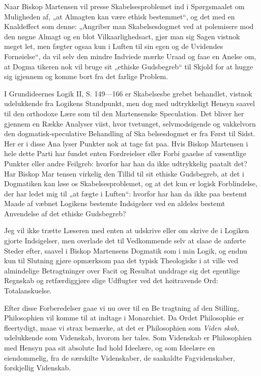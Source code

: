 \documentclass[12pt]{book}
\newcommand{\opage}[1]{\marginnote{\footnotesize\textit{[#1]}}}
\begin{document}
Naar Biskop Martensen vil presse Skabelsesproblemet
ind i Spørgsmaalet om Muligheden af, „at Almagten kan
være ethisk bestemmet“, og det med en Knaldeffect som denne:
„Angriber man Skabelsesdogmet ved at polemisere mod den
nøgne Almagt og en blot Vilkaarlighedsact, gjør man sig
Sagen vistnok meget let, men fægter ogsaa kun i Luften til
sin egen og de Uvidendes Fornøielse“, da vil selv den mindre
Indviede mærke Uraad og faae en Anelse om, at Dogma\-%
tikeren nok vil bruge sit „ethiske Gudsbegreb“ til Skjold for at
hugge sig igjennem og komme bort fra det farlige Problem.

I Grundideernes Logik II, S. 149---166 er Skabelsesbe\-%
grebet behandlet, vistnok udelukkende fra Logikens Standpunkt, men
dog med udtrykkeligt Hensyn saavel til den orthodoxe Lære som
til den Martensenske Speculation. Det bliver her gjennem
en Række Analyser viist, hvor tvetunget, selvmodsigende og
vakkelvorn den dogmatisk-speculative Behandling af Ska\-%
belsesdogmet er fra Først til Sidst. Her er i disse Ana\-%
lyser Punkter nok at tage fat paa. Hvis Biskop Martensen
i hele dette Parti har fundet enten Fordreielser eller Forbi\-%
gaaelse af væsentlige Punkter eller andre Feilgreb: hvorfor
har han da ikke udtrykkelig paatalt det? Har Biskop Mar\-%
tensen virkelig den Tillid til sit ethiske Gudsbegreb, at det i
Dogmatiken kan løse os Skabelsesproblemet, og at det kun
er logisk Forblindelse, der har ledet mig til „at fægte i
Luften“: hvorfor har han da ikke paa bestemt Maade af\-%
væbnet Logikens bestemte Indsigelser ved en aldeles bestemt
Anvendelse af det ethiske Gudsbegreb?

\opage{104}\setcounter{footnote}{0}%
Jeg vil ikke trætte Læseren med enten at udskrive eller om\-%
skrive de i Logiken gjorte Indsigelser, men overlade det til
Vedkommende selv at slaae de anførte Steder efter, saavel i
Biskop Martensens Dogmatik som i min Logik, og endnu kun
til Slutning gjøre opmærksom paa det typisk Theologiske i
at ville ved almindelige Betragtninger over Facit og Resultat
unddrage sig det egentlige Regnskab og retfærdiggjøre slige
Udflugter ved det høitravende Ord: Totalanskuelse.

Efter disse Forberedelser gaae vi nu over til en Be\-%
tragtning af den Stilling, Philosophien vil komme til at
indtage i Monarchiet. Da Ordet Philosophie er fleertydigt,
maae vi strax bemærke, at det er Philosophien som \emph{Viden\-%
skab}, udelukkende som Videnskab, hvorom her tales. Som
Videnskab er Philosophien med Hensyn paa sit absolute Ind\-%
hold Ideelære, og som Ideelære en eiendommelig, fra de
særskilte Videnskaber, de saakaldte Fagvidenskaber, forskjellig
Videnskab.
\end{document}
